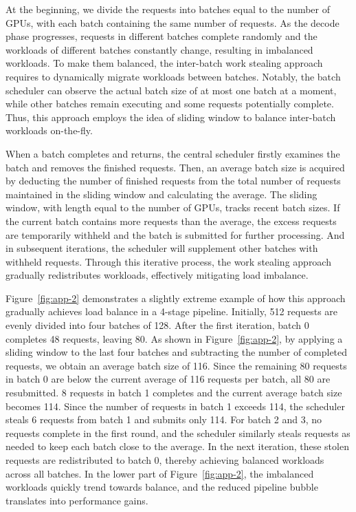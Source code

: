 At the beginning, we divide the requests into batches equal to the number of GPUs, with each batch containing the same number of requests.
As the decode phase progresses, requests in different batches complete randomly and the workloads of different batches constantly change, resulting in imbalanced workloads.
To make them balanced, the inter-batch work stealing approach requires to dynamically migrate workloads between batches.
Notably, the batch scheduler can observe the actual batch size of at most one batch at a moment, while other batches remain executing and some requests potentially complete.
Thus, this approach employs the idea of sliding window to balance inter-batch workloads on-the-fly.

When a batch completes and returns, the central scheduler firstly examines the batch and removes the finished requests.
Then, an average batch size is acquired by deducting the number of finished requests from the total number of requests maintained in the sliding window and calculating the average.
The sliding window, with length equal to the number of GPUs, tracks recent batch sizes.
If the current batch contains more requests than the average, the excess requests are temporarily withheld and the batch is submitted for further processing.
And in subsequent iterations, the scheduler will supplement other batches with withheld requests. 
Through this iterative process, the work stealing approach gradually redistributes workloads, effectively mitigating load imbalance. 

Figure~\ref{fig:app-2} demonstrates a slightly extreme example of how this approach gradually achieves load balance in a 4-stage pipeline.  
Initially, 512 requests are evenly divided into four batches of 128. 
After the first iteration, batch 0 completes 48 requests, leaving 80.
As shown in Figure~\ref{fig:app-2}, by applying a sliding window to the last four batches and subtracting the number of completed requests, we obtain an average batch size of 116.
Since the remaining 80 requests in batch 0 are below the current average of 116 requests per batch, all 80 are resubmitted.
8 requests in batch 1 completes and the current average batch size becomes 114. Since the number of requests in batch 1 exceeds 114, the scheduler steals 6 requests from batch 1 and submits only 114. For batch 2 and 3, no requests complete in the first round, and the scheduler similarly steals requests as needed to keep each batch close to the average. In the next iteration, these stolen requests are redistributed to batch 0, thereby achieving balanced workloads across all batches. 
In the lower part of Figure~\ref{fig:app-2}, the imbalanced workloads quickly trend towards balance, and the reduced pipeline bubble translates into performance gains.


